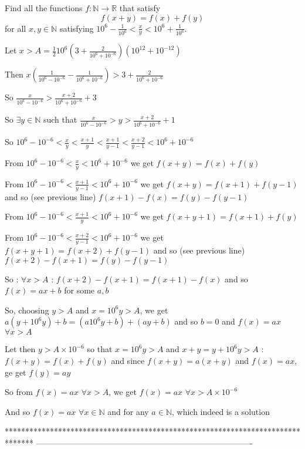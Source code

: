 \begin{solution}
	\begin{tcolorbox}Find all the functions $f:\mathbb{N}\to\mathbb{R}$ that satisfy
\[ f(x+y)=f(x)+f(y) \] for all $x,y\in\mathbb{N}$ satisfying $10^6-\frac{1}{10^6} < \frac{x}{y} < 10^6+\frac{1}{10^6}$.\end{tcolorbox}
Let $x>A=\frac 1210^6(3+\frac 2{10^6+10^{-6}})(10^{12}+10^{-12})$

Then $x(\frac 1{10^6-10^{-6}}-\frac 1{10^6+10^{-6}})>3+\frac 2{10^6+10^{-6}}$

So $\frac x{10^6-10^{-6}}>\frac {x+2}{10^6+10^{-6}}+3$

So $\exists y\in\mathbb N$ such that $\frac x{10^6-10^{-6}}>y>\frac {x+2}{10^6+10^{-6}}+1$

So $10^6-10^{-6}<\frac xy<\frac{x+1}y<\frac{x+1}{y-1}<\frac{x+2}{y-1}<10^6+10^{-6}$

From $10^6-10^{-6}<\frac xy<10^6+10^{-6}$ we get $f(x+y)=f(x)+f(y)$

From $10^6-10^{-6}<\frac{x+1}{y-1}<10^6+10^{-6}$ we get $f(x+y)=f(x+1)+f(y-1)$ and so (see previous line) $f(x+1)-f(x)=f(y)-f(y-1)$

From $10^6-10^{-6}<\frac{x+1}y<10^6+10^{-6}$ we get $f(x+y+1)=f(x+1)+f(y)$

From $10^6-10^{-6}<\frac{x+2}{y-1}<10^6+10^{-6}$ we get $f(x+y+1)=f(x+2)+f(y-1)$ and so (see previous line) $f(x+2)-f(x+1)=f(y)-f(y-1)$

So : $\forall x>A$ : $f(x+2)-f(x+1)=f(x+1)-f(x)$ and so $f(x)=ax+b$ for some $a,b$

So, choosing $y>A$ and $x=10^6y>A$, we get $a(y+10^6y)+b=(a10^6y+b)+(ay+b)$ and so $b=0$ and $f(x)=ax$ $\forall x>A$

Let then $y>A\times 10^{-6}$ so that $x=10^6y>A$ and $x+y=y+10^6y>A$ : $f(x+y)=f(x)+f(y)$ and since $f(x+y)=a(x+y)$ and $f(x)=ax$, ge get $f(y)=ay$

So from $f(x)=ax$ $\forall x>A$, we get $f(x)=ax$ $\forall x>A\times 10^{-6}$

And so $\boxed{f(x)=ax}$ $\forall x\in\mathbb N$ and for any $a\in\mathbb N$, which indeed is a solution
\end{solution}
*******************************************************************************
-------------------------------------------------------------------------------


